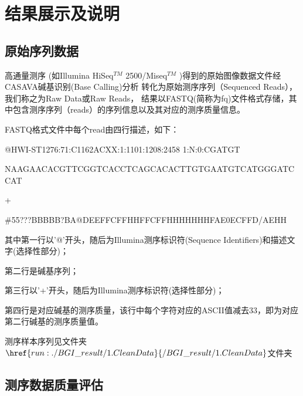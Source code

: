 \documentclass[10pt, oneside,a4paper]{article}
\begin{document}
\section{结果展示及说明}
\subsection{原始序列数据}
高通量测序 (如Illumina HiSeq$^{TM}$ 2500/Miseq$^{TM}$ )得到的原始图像数据文件经CASAVA碱基识别(Base Calling)分析
转化为原始测序序列（Sequenced Reads），我们称之为Raw Data或Raw Reads，
结果以FASTQ(简称为fq)文件格式存储，其中包含测序序列（reads）的序列信息以及其对应的测序质量信息。\par
FASTQ格式文件中每个read由四行描述，如下：\par
@HWI-ST1276:71:C1162ACXX:1:1101:1208:2458 1:N:0:CGATGT\par
NAAGAACACGTTCGGTCACCTCAGCACACTTGTGAATGTCATGGGATCCAT\par
+\par
\#55???BBBBB?BA@DEEFFCFFHHFFCFFHHHHHHHFAE0ECFFD/AEHH\par
其中第一行以'@'开头，随后为Illumina测序标识符(Sequence Identifiers)和描述文字(选择性部分)；\par
第二行是碱基序列；\par
第三行以'+'开头，随后为Illumina测序标识符(选择性部分)；\par
第四行是对应碱基的测序质量，该行中每个字符对应的ASCII值减去33，即为对应第二行碱基的测序质量值。\par
测序样本序列见文件夹$\href{run:./BGI\_result/1.CleanData}{/BGI\_result/1.CleanData}$文件夹\par
\subsection{测序数据质量评估}
\end{document}
